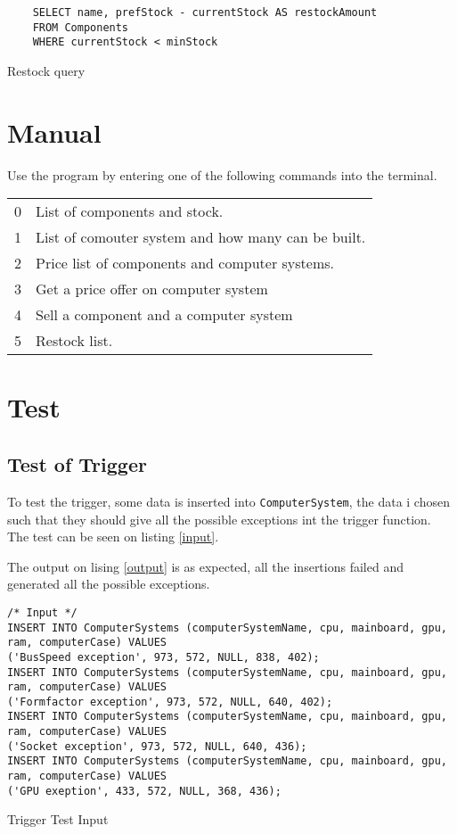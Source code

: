 \documentclass[12pt,a4paper]{article}
\begin{document}
\begin{listing}[!htbp]
	\begin{verbatim}
	SELECT name, prefStock - currentStock AS restockAmount
	FROM Components
	WHERE currentStock < minStock
	\end{verbatim}
	\caption{Restock query}
\label{lst:restock}
\end{listing}

\section{Manual}
Use the program by entering one of the following commands into the terminal.

{\ttfamily
\begin{center}
\begin{tabular}{ll}
    0 & List of components and stock. \\ 
    1 & List of comouter system and how many can be built. \\ 
    2 & Price list of components and computer systems. \\ 
    3 & Get a price offer on computer system \\
    4 & Sell a component and a computer system \\
    5 & Restock list. \\ 
\end{tabular}
\end{center}}

\section{Test}
\subsection{Test of Trigger}
To test the trigger, some data is inserted into \texttt{ComputerSystem}, the data i chosen such that they should give all the possible exceptions int the trigger function. The test can be seen on listing \ref{input}.

The output on lising \ref{output} is as expected, all the insertions failed and generated all the possible exceptions.

\begin{listing}[!htbp]
\begin{verbatim}
/* Input */
INSERT INTO ComputerSystems (computerSystemName, cpu, mainboard, gpu, ram, computerCase) VALUES
('BusSpeed exception', 973, 572, NULL, 838, 402);
INSERT INTO ComputerSystems (computerSystemName, cpu, mainboard, gpu, ram, computerCase) VALUES
('Formfactor exception', 973, 572, NULL, 640, 402);
INSERT INTO ComputerSystems (computerSystemName, cpu, mainboard, gpu, ram, computerCase) VALUES
('Socket exception', 973, 572, NULL, 640, 436);
INSERT INTO ComputerSystems (computerSystemName, cpu, mainboard, gpu, ram, computerCase) VALUES
('GPU exeption', 433, 572, NULL, 368, 436);
\end{verbatim}
\caption{Trigger Test Input}
\label{input}
\end{listing}
\end{document}
